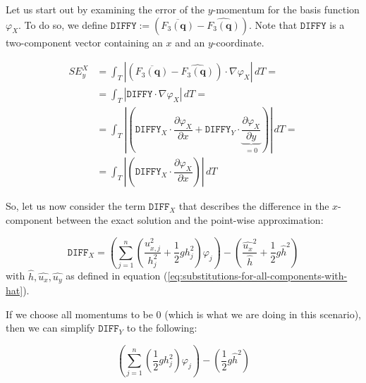 \documentclass{article}
\newcommand{\pd}[2]{\dfrac{\partial #1}{\partial #2}}
\renewcommand{\phi}{\varphi}
\begin{document}


Let us start out by examining the error of the $y$-momentum for the basis function $\phi_X$. To do so, we define $\mathtt{DIFFY}:=\left( \overline{F_3(\mathbf{q})} - \widehat{F_3(\mathbf{q})} \right)$. Note that $\mathtt{DIFFY}$ is a two-component vector containing an $x$ and an $y$-coordinate.

\begin{align*}
  SE_y^X &= \int_T \left| \left( \overline{F_3(\mathbf{q})} - \widehat{F_3(\mathbf{q})} \right) \cdot \nabla \phi_X \right| \, dT = \\
  &= \int_T \left| \mathtt{DIFFY} \cdot \nabla \phi_X \right|\,dT = \\
  &= \int_T \left| \left( \mathtt{DIFFY}_X \cdot \pd{\phi_X}{x} + \mathtt{DIFFY}_Y \cdot \underbrace{\pd{\phi_X}{y}}_{=0} \right) \right| \, dT = \\
  &=\int_T \left| \left( \mathtt{DIFFY}_X \cdot \pd{\phi_X}{x} \right) \right| \, dT
\end{align*}

So, let us now consider the term $\mathtt{DIFF}_X$ that describes the difference in the $x$-component between the exact solution and the point-wise approximation:

\begin{equation*}
  \mathtt{DIFF}_X = \left( \sum_{j=1}^n \left(\frac{u_{x,j}^2}{h_j^2} + \frac{1}{2} g h_j^2\right) \phi_j \right) - \left( \frac{\widehat{u_x}^2}{\widehat h} + \frac{1}{2} g \widehat{h}^2\right)
\end{equation*}
with $\widehat h, \widehat{u_x}, \widehat{u_y}$ as defined in equation (\ref{eq:substitutions-for-all-components-with-hat}).

If we choose all momentums to be 0 (which is what we are doing in this scenario), then we can simplify $\mathtt{DIFF}_Y$ to the following:

\begin{equation*}
  \left( \sum_{j=1}^n \left(\frac{1}{2} g h_j^2\right) \phi_j \right) - \left( \frac{1}{2} g \widehat{h}^2\right)
\end{equation*}
\end{document}
